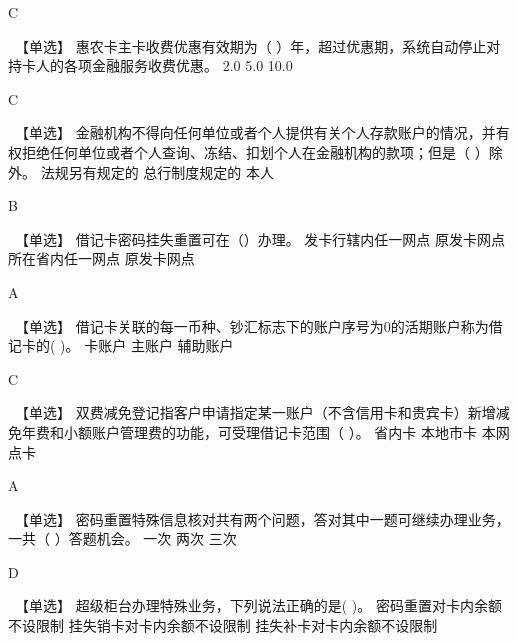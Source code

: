 \documentclass[kindlepaper]{BHCexam4kindle}
\begin{document}
\begin{questions}
\begin{solution} C \end{solution}
\qs　【单选】 惠农卡主卡收费优惠有效期为（   ）年，超过优惠期，系统自动停止对持卡人的各项金融服务收费优惠。 \xx
{} {  2.0 } { 5.0 } { 10.0 }
\begin{solution} C \end{solution}
\qs　【单选】 金融机构不得向任何单位或者个人提供有关个人存款账户的情况，并有权拒绝任何单位或者个人查询、冻结、扣划个人在金融机构的款项；但是（   ）除外。 \xx
{} {  法规另有规定的 } { 总行制度规定的 } { 本人 }
\begin{solution} B \end{solution}
\qs　【单选】 借记卡密码挂失重置可在（）办理。 \xx
{} {  发卡行辖内任一网点 } { 原发卡网点所在省内任一网点 } { 原发卡网点 }
\begin{solution} A \end{solution}
\qs　【单选】 借记卡关联的每一币种、钞汇标志下的账户序号为0的活期账户称为借记卡的(    )。 \xx
{} {  卡账户 } { 主账户 } { 辅助账户 }
\begin{solution} C \end{solution}
\qs　【单选】 双费减免登记指客户申请指定某一账户（不含信用卡和贵宾卡）新增减免年费和小额账户管理费的功能，可受理借记卡范围（  ）。 \xx
{} {  省内卡 } { 本地市卡 } { 本网点卡 }
\begin{solution} A \end{solution}
\qs　【单选】 密码重置特殊信息核对共有两个问题，答对其中一题可继续办理业务，一共（  ）答题机会。 \xx
{} {  一次 } { 两次 } { 三次 }
\begin{solution} D \end{solution}
\qs　【单选】 超级柜台办理特殊业务，下列说法正确的是(  )。 \xx
{} {  密码重置对卡内余额不设限制 } { 挂失销卡对卡内余额不设限制 } { 挂失补卡对卡内余额不设限制 }

\end{questions}
\end{document}
